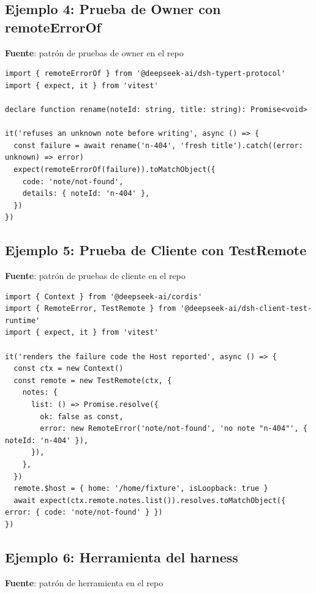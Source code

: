 \documentclass[11pt,a4paper]{article}
\begin{document}
\subsection*{Ejemplo 4: Prueba de Owner con remoteErrorOf}


\textbf{Fuente}: patrón de pruebas de owner en el repo


\begin{lstlisting}
import { remoteErrorOf } from '@deepseek-ai/dsh-typert-protocol'
import { expect, it } from 'vitest'

declare function rename(noteId: string, title: string): Promise<void>

it('refuses an unknown note before writing', async () => {
  const failure = await rename('n-404', 'fresh title').catch((error: unknown) => error)
  expect(remoteErrorOf(failure)).toMatchObject({
    code: 'note/not-found',
    details: { noteId: 'n-404' },
  })
})
\end{lstlisting}


\subsection*{Ejemplo 5: Prueba de Cliente con TestRemote}


\textbf{Fuente}: patrón de pruebas de cliente en el repo


\begin{lstlisting}
import { Context } from '@deepseek-ai/cordis'
import { RemoteError, TestRemote } from '@deepseek-ai/dsh-client-test-runtime'
import { expect, it } from 'vitest'

it('renders the failure code the Host reported', async () => {
  const ctx = new Context()
  const remote = new TestRemote(ctx, {
    notes: {
      list: () => Promise.resolve({
        ok: false as const,
        error: new RemoteError('note/not-found', 'no note "n-404"', { noteId: 'n-404' }),
      }),
    },
  })
  remote.$host = { home: '/home/fixture', isLoopback: true }
  await expect(ctx.remote.notes.list()).resolves.toMatchObject({ error: { code: 'note/not-found' } })
})
\end{lstlisting}


\subsection*{Ejemplo 6: Herramienta del harness}


\textbf{Fuente}: patrón de herramienta en el repo
\end{document}
